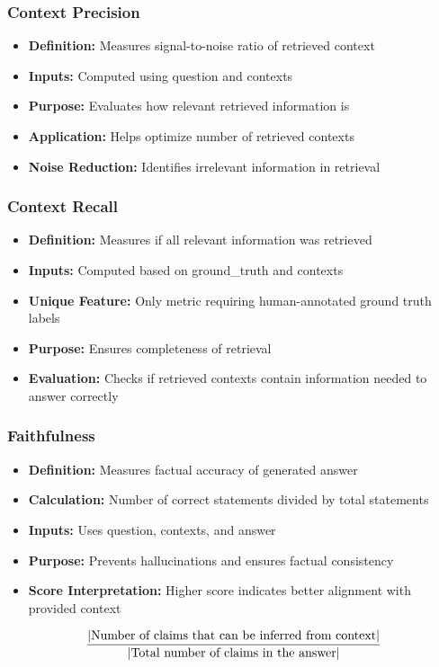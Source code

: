 \begin{frame}[fragile]\frametitle{Context Precision}
  \begin{itemize}
    \item \textbf{Definition:} Measures signal-to-noise ratio of retrieved context
    \item \textbf{Inputs:} Computed using question and contexts
    \item \textbf{Purpose:} Evaluates how relevant retrieved information is
    \item \textbf{Application:} Helps optimize number of retrieved contexts
    \item \textbf{Noise Reduction:} Identifies irrelevant information in retrieval
  \end{itemize}
\end{frame}

\begin{frame}[fragile]\frametitle{Context Recall}
  \begin{itemize}
    \item \textbf{Definition:} Measures if all relevant information was retrieved
    \item \textbf{Inputs:} Computed based on ground\_truth and contexts
    \item \textbf{Unique Feature:} Only metric requiring human-annotated ground truth labels
    \item \textbf{Purpose:} Ensures completeness of retrieval
    \item \textbf{Evaluation:} Checks if retrieved contexts contain information needed to answer correctly
  \end{itemize}
\end{frame}

\begin{frame}[fragile]\frametitle{Faithfulness}
  \begin{itemize}
    \item \textbf{Definition:} Measures factual accuracy of generated answer
    \item \textbf{Calculation:} Number of correct statements divided by total statements
    \item \textbf{Inputs:} Uses question, contexts, and answer
    \item \textbf{Purpose:} Prevents hallucinations and ensures factual consistency
    \item \textbf{Score Interpretation:} Higher score indicates better alignment with provided context
  \end{itemize}

$${|\text{Number of claims that can be inferred from context}| \over |\text{Total number of claims in the answer}|}$$  
\end{frame}

